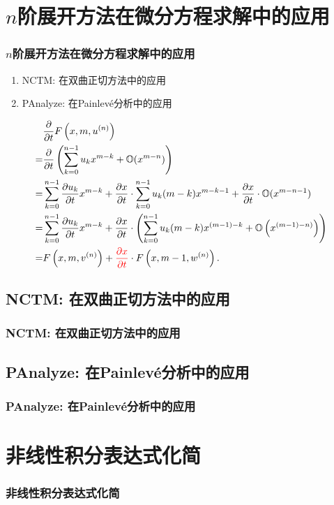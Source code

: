 \documentclass[serif]{beamer}
\newcommand{\sbrace}[1]{\left(#1\right)}
\newcommand{\up}[1]{^{(#1)}}
\newcommand{\OO}{\ensuremath{\mathbb O}}%
\newcommand{\DIF}[1]{\ensuremath{\frac{\partial}{\partial #1}}}
\newcommand{\DIFF}[2]{\ensuremath{\frac{\partial #1}{\partial #2}}}
\newcommand{\Painleve}{Painlev{\'e}}
\begin{document}
\section{$n$阶展开方法在微分方程求解中的应用}
\begin{frame}
\frametitle{$n$阶展开方法在微分方程求解中的应用}
\begin{enumerate}
\item NCTM: 在双曲正切方法中的应用
\item PAnalyze: 在\Painleve{}分析中的应用
\end{enumerate}
\end{frame}

\begin{frame}
\begin{equation*}
\begin{split}
& \DIF{t}F\sbrace{x,m,u\up{n}}  \\
=& \DIF{t}\sbrace{\sum_{k=0}^{n-1}{u_k x^{m-k}}+\OO(x^{m-n})} \\
=& \sum_{k=0}^{n-1}{\DIFF{u_k}{t}x^{m-k}}+\DIFF{x}{t}\cdot\sum_{k=0}^{n-1}{u_k (m-k) x^{m-k-1}}+\DIFF{x}{t}\cdot\OO(x^{m-n-1}) \\
=& \sum_{k=0}^{n-1}{\DIFF{u_k}{t}x^{m-k}}+\DIFF{x}{t}\cdot\sbrace{\sum_{k=0}^{n-1}{u_k (m-k) x^{(m-1)-k}}+\OO\sbrace{x^{(m-1)-n)}}} \\ 
=& F\sbrace{x,m,v\up{n}}+{\color{red}\DIFF{x}{t}}\cdot F\sbrace{x,m-1,w\up{n}}.
\end{split}
\end{equation*}
\end{frame}

\subsection{NCTM: 在双曲正切方法中的应用}
\begin{frame}
\frametitle{NCTM: 在双曲正切方法中的应用}
\end{frame}

\subsection{PAnalyze: 在\Painleve{}分析中的应用}
\begin{frame}
\frametitle{PAnalyze: 在\Painleve{}分析中的应用}
\end{frame}

\section{非线性积分表达式化简}
\begin{frame}
\frametitle{非线性积分表达式化简}
\end{frame}
\end{document}
